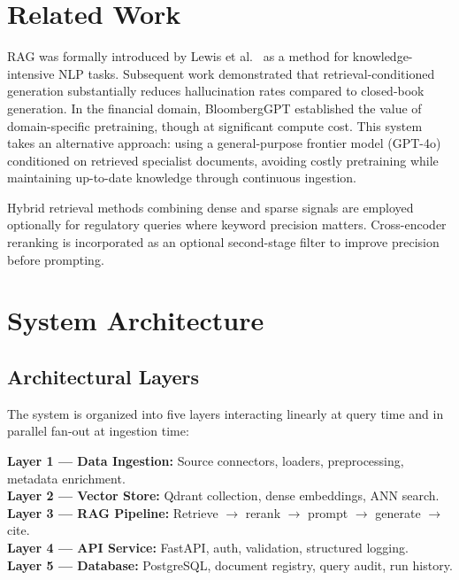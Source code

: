 \documentclass[10pt,a4paper,twocolumn]{article}
\begin{document}
\section{Related Work}

RAG was formally introduced by Lewis et al.\ \cite{lewis2020rag} as a method for
knowledge-intensive NLP tasks. Subsequent work \cite{guu2020realm, izacard2021leveraging}
demonstrated that retrieval-conditioned generation substantially reduces hallucination rates
compared to closed-book generation. In the financial domain, BloombergGPT \cite{wu2023bloomberggpt}
established the value of domain-specific pretraining, though at significant compute cost.
This system takes an alternative approach: using a general-purpose frontier model (GPT-4o)
conditioned on retrieved specialist documents, avoiding costly pretraining while maintaining
up-to-date knowledge through continuous ingestion.

Hybrid retrieval methods combining dense and sparse signals \cite{formal2021splade} are
employed optionally for regulatory queries where keyword precision matters. Cross-encoder
reranking \cite{nogueira2019passage} is incorporated as an optional second-stage filter to
improve precision before prompting.

\section{System Architecture}

\subsection{Architectural Layers}

The system is organized into five layers interacting linearly at query time and in parallel
fan-out at ingestion time:

\begin{infobox}
\scriptsize
\textbf{Layer 1 --- Data Ingestion:} Source connectors, loaders, preprocessing, metadata enrichment.\\
\textbf{Layer 2 --- Vector Store:} Qdrant collection, dense embeddings, ANN search.\\
\textbf{Layer 3 --- RAG Pipeline:} Retrieve $\to$ rerank $\to$ prompt $\to$ generate $\to$ cite.\\
\textbf{Layer 4 --- API Service:} FastAPI, auth, validation, structured logging.\\
\textbf{Layer 5 --- Database:} PostgreSQL, document registry, query audit, run history.
\end{infobox}
\end{document}
